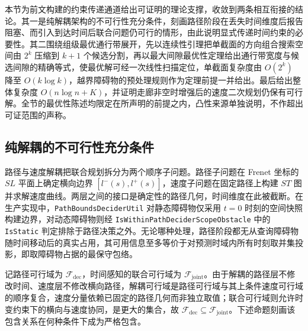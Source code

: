 \documentclass[a4paper,11pt]{ctexart}
\theoremstyle{definition}
\begin{document}
本节为前文构建的约束传递通道给出可证明的理论支撑，收敛到两条相互衔接的结论。其一是纯解耦架构的不可行性充分条件，刻画路径阶段在丢失时间维度后报告阻塞、而引入到达时间后联合问题仍可行的情形，由此说明显式传递时间约束的必要性。其二围绕组级最优通行带展开，先以连续性引理把单截面的方向组合搜索空间由 $2^k$ 压缩到 $k+1$ 个候选分割，再以最大间隙最优性定理给出通行带宽度与候选间隙的精确等式，使最优解可经一次线性扫描定位，单截面复杂度由 $O(2^k)$ 降至 $O(k\log k)$，越界障碍物的预处理规则作为定理前提一并给出。最后给出整体复杂度 $O(n\log n + K)$，并证明走廊非空时增强后的速度二次规划仍保有可行解。全节的最优性陈述均限定在所声明的前提之内，凸性来源单独说明，不作超出可证范围的声称。

\subsection{纯解耦的不可行性充分条件}
\label{sec:thy_infeasible}

路径与速度解耦把联合规划拆分为两个顺序子问题。路径子问题在 Frenet 坐标的 $SL$ 平面上确定横向边界 $[l^{-}(s), l^{+}(s)]$，速度子问题在固定路径上构建 $ST$ 图并求解速度曲线。两层之间的接口是确定性的路径几何，时间维度在此被截断。在生产实现中，\texttt{PathBoundsDeciderUtil} 对静态障碍物仅采用 $t{=}0$ 时刻的空间快照构建边界，对动态障碍物则经 \texttt{IsWithinPathDeciderScopeObstacle} 中的 \texttt{IsStatic} 判定排除于路径决策之外。无论哪种处理，路径阶段都无从查询障碍物随时间移动后的真实占用，其可用信息至多等价于对预测时域内所有时刻取并集投影，即取障碍物占据的最保守包络。

记路径可行域为 $\mathcal{F}_{\text{dec}}$，时间感知的联合可行域为 $\mathcal{F}_{\text{joint}}$。由于解耦的路径层不修改时间、速度层不修改横向路径，解耦可行域是路径可行域与其上条件速度可行域的顺序复合，速度分量依赖已固定的路径几何而非独立取值；联合可行域则允许时变约束下的横向与速度协同，是更大的集合，故 $\mathcal{F}_{\text{dec}} \subseteq \mathcal{F}_{\text{joint}}$。下述命题刻画该包含关系在何种条件下成为严格包含。
\end{document}
